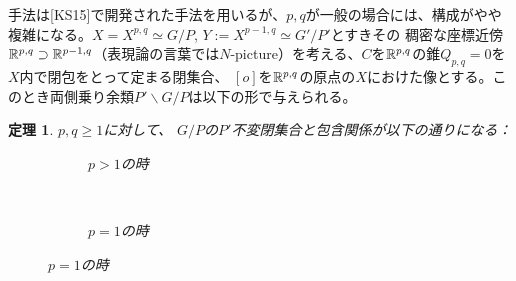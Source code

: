\documentclass[12pt]{msjproc} %
\newtheorem{theorem}{定理}
\theoremstyle{definition}
\theoremstyle{remark}
\begin{document}
手法は[KS15]で開発された手法を用いるが、$p,q$が一般の場合には、構成がやや複雑になる。$X=X^{p,q}\simeq G/P$, $Y:=X^{p-1,q}\simeq G'/P'$とすきその
稠密な座標近傍$\mathbb{R}^{p,q}\supset\mathbb{R}^{p-1,q}$（表現論の言葉では$N$-picture）を考える、$C$を$\mathbb{R}^{p,q}$の錐$Q_{p,q}=0$を$X$内で閉包をとって定まる閉集合、
$[o]$を$\mathbb{R}^{p,q}$の原点の$X$におけた像とする。このとき両側乗り余類$P'\backslash G/P$は以下の形で与えられる。
\begin{theorem}
$p, q \geqslant 1$に対して、
  $G/P$の$P'$不変閉集合と{包含関係}が以下の通りになる：\\
  \begin{figure}[H]
	  \vspace{-4ex}
    \centering
    \begin{subfigure}{0.3\textwidth}
	\caption{$p>1$の時}
    \end{subfigure}
    ~ %
    \begin{subfigure}{0.3\textwidth}
	\raisebox{40mm}
	{}
	\caption{$p=1$の時}
    \end{subfigure}
\end{figure}
\end{theorem}
\end{document}
